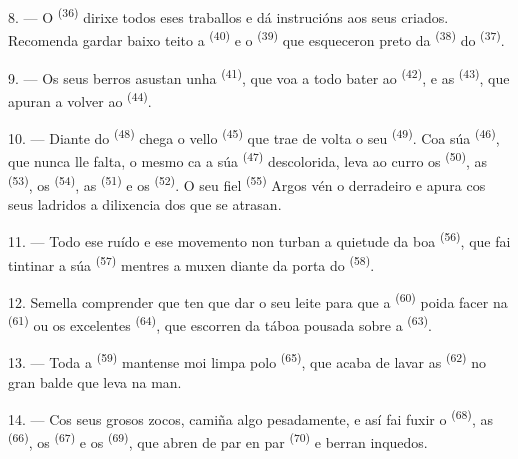 8. --- O  \textsuperscript{(36)} dirixe todos eses traballos e dá
instrucións aos seus criados. Recomenda gardar baixo teito a 
\textsuperscript{(40)} e o  \textsuperscript{(39)} que esqueceron preto da
 \textsuperscript{(38)} do  \textsuperscript{(37)}.

9. --- Os seus berros asustan unha  \textsuperscript{(41)}, que voa a todo bater
ao  \textsuperscript{(42)}, e as  \textsuperscript{(43)}, que
apuran a volver ao  \textsuperscript{(44)}.

10. --- Diante do  \textsuperscript{(48)} chega o vello
 \textsuperscript{(45)} que trae de volta o seu 
\textsuperscript{(49)}. Coa súa  \textsuperscript{(46)}, que nunca lle falta,
o mesmo ca a súa  \textsuperscript{(47)} descolorida, leva ao curro os
 \textsuperscript{(50)}, as  \textsuperscript{(53)}, os
 \textsuperscript{(54)}, as  \textsuperscript{(51)} e os
 \textsuperscript{(52)}. O seu fiel
 \textsuperscript{(55)} Argos vén o derradeiro e apura cos seus ladridos a
dilixencia dos que se atrasan.

11. --- Todo ese ruído e ese movemento non turban a quietude da boa 
\textsuperscript{(56)}, que fai tintinar a súa  \textsuperscript{(57)}
mentres a muxen diante da porta do  \textsuperscript{(58)}.

12. Semella comprender que ten que dar o seu leite para que a 
\textsuperscript{(60)} poida facer  na 
\textsuperscript{(61)} ou os excelentes  \textsuperscript{(64)}, que escorren
da táboa pousada sobre a  \textsuperscript{(63)}.

13. --- Toda a  \textsuperscript{(59)} mantense moi limpa polo
 \textsuperscript{(65)}, que acaba de lavar as
 \textsuperscript{(62)} no gran balde que leva na man.

\VUsaut{3.0mm}
\VUsaut{3.0mm}

14. --- Cos seus grosos zocos, camiña algo pesadamente, e así fai fuxir o
 \textsuperscript{(68)}, as  \textsuperscript{(66)}, os
 \textsuperscript{(67)} e os  \textsuperscript{(69)}, que
abren de par en par  \textsuperscript{(70)} e berran inquedos.

